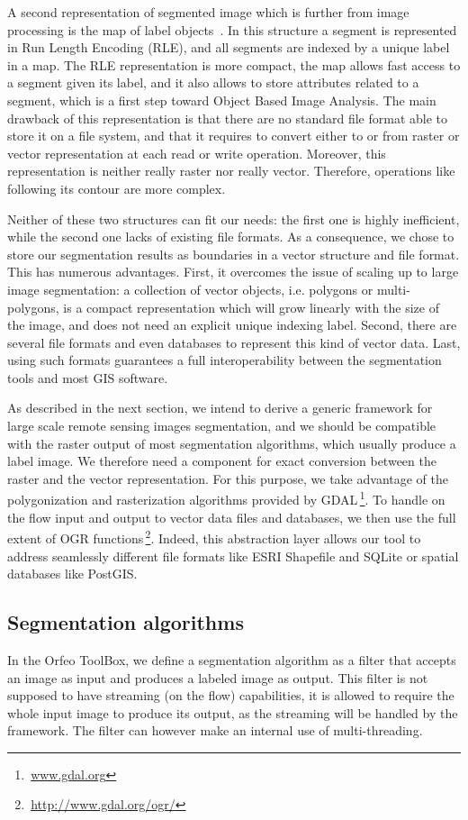 \documentclass{josis}
\newcommand{\furl}[1]{$\,$\footnote{$\,$\url{#1}}}
\begin{document}
A second representation of segmented image which is further from image
processing is the map of label objects~\cite{lehmann2008label}. In
this structure a segment is represented in Run Length Encoding (RLE),
and all segments are indexed by a unique label in a map. The RLE
representation is more compact, the map allows fast access to a
segment given its label, and it also allows to store attributes
related to a segment, which is a first step toward Object Based Image
Analysis. The main drawback of this representation is that there are
no standard file format able to store it on a file system, and that it
requires to convert either to or from raster or vector representation
at each read or write operation. Moreover, this representation is
neither really raster nor really vector. Therefore, operations like
following its contour are more complex.

Neither of these two structures can fit our needs: the first one is highly
inefficient, while the second one lacks of existing file formats. As a
consequence, we chose to store our segmentation results as boundaries in a
vector structure and file format. This has numerous advantages. First, it
overcomes the issue of scaling up to large image segmentation: a collection of
vector objects, i.e. polygons or multi-polygons, is a compact representation
which will grow linearly with the size of the image, and does not need an
explicit unique indexing label. Second, there are several file formats and even
databases to represent this kind of vector data. Last, using such formats
guarantees a full interoperability between the segmentation tools and most GIS
software.

As described in the next section, we intend to derive a generic
framework for large scale remote sensing images segmentation, and we
should be compatible with the raster output of most segmentation
algorithms, which usually produce a label image. We therefore need a
component for exact conversion between the raster and the vector
representation. For this purpose, we take advantage of the
polygonization and rasterization algorithms provided by
GDAL\furl{www.gdal.org}. To handle on the flow input and output to
vector data files and databases, we then use the full extent of OGR
functions\furl{http://www.gdal.org/ogr/}. Indeed, this abstraction
layer allows our tool to address seamlessly different file formats
like ESRI Shapefile and SQLite or spatial databases like PostGIS.

\subsection{Segmentation algorithms}
In the Orfeo ToolBox, we define a segmentation algorithm as a filter
that accepts an image as input and produces a labeled
image as output. This filter is not supposed to have streaming (on the
flow) capabilities, it is allowed to require the whole input image to
produce its output, as the streaming will be handled by the
framework. The filter can however make an internal use of
multi-threading.
\end{document}
